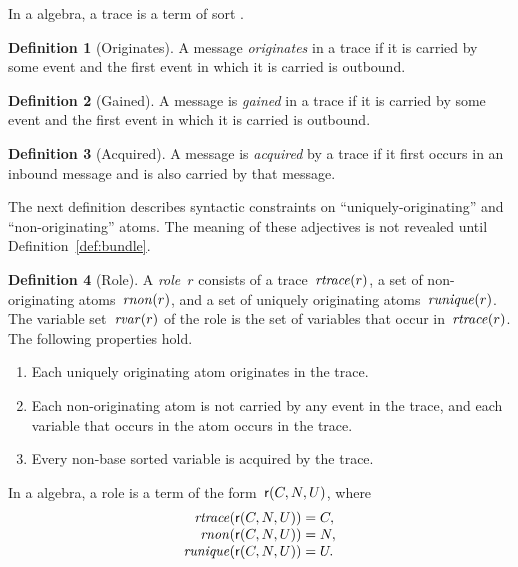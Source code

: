 \documentclass[12pt]{article}
\theoremstyle{definition}
\newtheorem{defn}{Definition}[section]
\begin{document}
In a {\cpsa} algebra, a trace is a term of sort  .

\begin{defn}[Originates]
A message \emph{originates} in a trace if it is carried by some
event and the first event in which it is carried is outbound.
\end{defn}

\begin{defn}[Gained]
A message is \emph{gained} in a trace if it is carried by some
event and the first event in which it is carried is outbound.
\end{defn}

\begin{defn}[Acquired]
A message is \emph{acquired} by a trace if it first occurs in an
inbound message and is also carried by that message.
\end{defn}

The next definition describes syntactic constraints on
``uniquely-originating'' and ``non-originating'' atoms.  The meaning
of these adjectives is not revealed until Definition~\ref{def:bundle}.

\begin{defn}[Role]\label{def:role}
A \emph{role}~$r$ consists of a trace~$\operatorname{\mathit{rtrace}}(r)$, a set of
non-originating atoms~$\operatorname{\mathit{rnon}}(r)$, and a set of uniquely
originating atoms~$\operatorname{\mathit{runique}}(r)$.  The variable set~$\operatorname{\mathit{rvar}}(r)$
of the role is the set of variables that occur in~$\operatorname{\mathit{rtrace}}(r)$.
The following properties hold.
\begin{enumerate}
\item Each uniquely originating atom originates in the trace.
\item Each non-originating atom is not carried by any event in the
  trace, and each variable that occurs in the atom occurs in the
  trace.
\item Every non-base sorted variable is acquired by the trace.
\end{enumerate}
\end{defn}

In a {\cpsa} algebra, a role is a term of the form~$\operatorname{\mathsf{r}}(C,N,U)$,
where
$$\begin{array}{r@{}c@{}l}
\fn{rtrace}(\cn{r}(C,N,U))&{}={}&C,\\
\fn{rnon}(\cn{r}(C,N,U))&{}={}&N,\\
\fn{runique}(\cn{r}(C,N,U))&{}={}&U.
\end{array}$$
\end{document}
